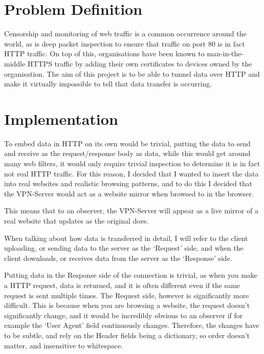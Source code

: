 \documentclass[12pt]{article}
\begin{document}
\maketitle
\tableofcontents
\newpage
\section{Problem Definition}
Censorship and monitoring of web traffic is a common occurrence around the world, as is deep packet inspection to ensure that traffic on port 80 is in fact HTTP traffic.
On top of this, organisations have been known to man-in-the-middle HTTPS traffic by adding their own certificates to devices owned by the organisation.
The aim of this project is to be able to tunnel data over HTTP and make it virtually impossible to tell that data transfer is occurring.

\section{Implementation}
To embed data in HTTP on its own would be trivial, putting the data to send and receive as the request/response body as data, while this would get around many web filters, it would only require trivial inspection to determine it is in fact not real HTTP traffic.
For this reason, I decided that I wanted to insert the data into real websites and realistic browsing patterns, and to do this I decided that the VPN-Server would act as a website mirror when browsed to in the browser.

This means that to an observer, the VPN-Server will appear as a live mirror of a real website that updates as the original does.

When talking about how data is transferred in detail, I will refer to the client uploading, or sending data to the server as the `Request' side, and when the client downloads, or receives data from the server as the `Response' side.

Putting data in the Response side of the connection is trivial, as when you make a HTTP request, data is returned, and it is often different even if the same request is sent multiple times.
The Request side, however is significantly more difficult. This is because when you are browsing a website, the request doesn't significantly change, and it would be incredibly obvious to an observer if for example the `User Agent' field continuously changes. Therefore, the changes have to be subtle, and rely on the Header fields being a dictionary, so order doesn't matter, and insensitive to whitespace.
\end{document}
